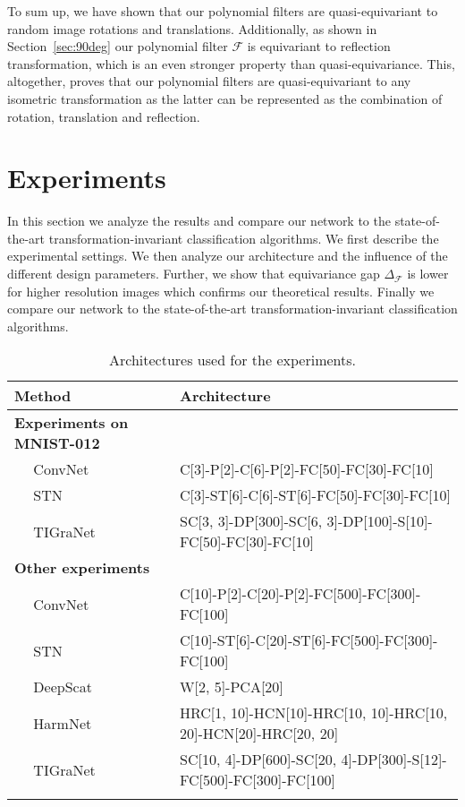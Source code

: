 \documentclass[10pt,journal,compsoc]{IEEEtran}
\newcommand{\mF}{\mathcal{F}}
\begin{document}
	To sum up, we have shown that our polynomial filters are quasi-equivariant to random image rotations and translations. Additionally, as shown in Section~\ref{sec:90deg} our polynomial filter $\mathcal{F}$ is equivariant to reflection transformation, which is an even stronger property than quasi-equivariance. This, altogether, proves that our polynomial filters are quasi-equivariant to any isometric transformation as the latter can be represented as the combination of rotation, translation and reflection.


	\section{Experiments}
	\label{s:exp}

	In this section we analyze the results and compare our network to the state-of-the-art transformation-invariant classification algorithms. We first describe the experimental settings. We then analyze our architecture and the influence of the different design parameters. Further, we show that equivariance gap $\Delta_\mF$ is lower for higher resolution images which confirms our theoretical results. Finally we compare our network to the state-of-the-art transformation-invariant classification algorithms.

	\begin{table*}[!ht]
		\centering
		\begin{tabularx}{\linewidth}{Xl}
			\toprule
			Method & Architecture \\
			\midrule{\bf Experiments on MNIST-012} & \\
			$\quad$ ConvNet~\cite{bb:lecun} & C[3]-P[2]-C[6]-P[2]-FC[50]-FC[30]-FC[10] \\
			$\quad$ STN~\cite{bb:STN} & C[3]-ST[6]-C[6]-ST[6]-FC[50]-FC[30]-FC[10] \\
			$\quad$ TIGraNet & SC[3, 3]-DP[300]-SC[6, 3]-DP[100]-S[10]-FC[50]-FC[30]-FC[10] \\
			\midrule{\bf Other experiments} & \\
			$\quad$ ConvNet~\cite{bb:lecun} & C[10]-P[2]-C[20]-P[2]-FC[500]-FC[300]-FC[100] \\
			$\quad$ STN~\cite{bb:STN} & C[10]-ST[6]-C[20]-ST[6]-FC[500]-FC[300]-FC[100] \\
			$\quad$ DeepScat~\cite{bb:oyallon2015deep} & W[2, 5]-PCA[20] \\
			$\quad$ HarmNet~\cite{bb:harm}  & HRC[1, 10]-HCN[10]-HRC[10, 10]-HRC[10, 20]-HCN[20]-HRC[20, 20] \\
			$\quad$ TIGraNet & SC[10, 4]-DP[600]-SC[20, 4]-DP[300]-S[12]-FC[500]-FC[300]-FC[100] \\
			\bottomrule
			\\
		\end{tabularx}
		\caption{Architectures used for the experiments.
		}
		\label{tab:arch_part2}
	\end{table*}
\end{document}
